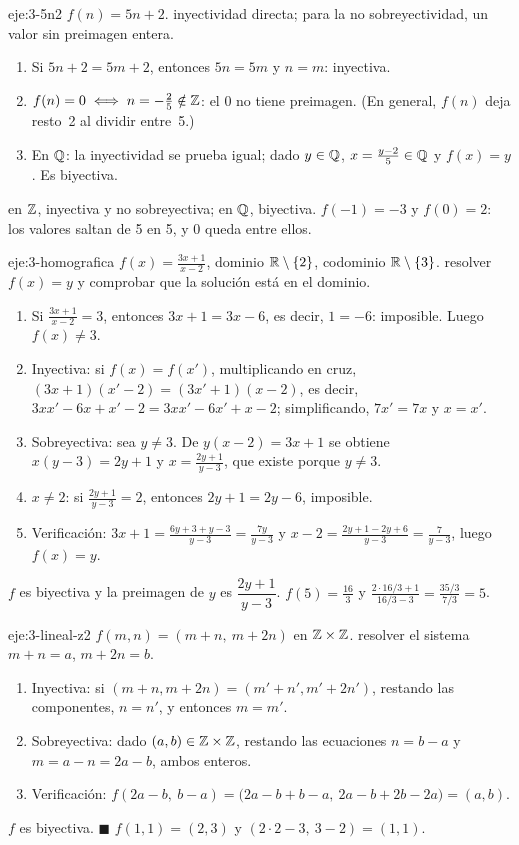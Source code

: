 \begin{solucion}{eje:3-5n2}
\datos $f(n)=5n+2$.
\planteamiento inyectividad directa; para la no sobreyectividad, un valor sin preimagen entera.
\pasos
\begin{enumerate}[label=\arabic*.]
  \item Si $5n+2=5m+2$, entonces $5n=5m$ y $n=m$: inyectiva.
  \item $f(n)=0\iff n=-\tfrac25\notin\mathbb{Z}$: el $0$ no tiene preimagen. (En general, $f(n)$ deja resto~2 al dividir entre~5.)
  \item En $\mathbb{Q}$: la inyectividad se prueba igual; dado $y\in\mathbb{Q}$, $x=\tfrac{y-2}{5}\in\mathbb{Q}$ y $f(x)=y$. Es biyectiva.
\end{enumerate}
\resultado en $\mathbb{Z}$, inyectiva y no sobreyectiva; en $\mathbb{Q}$, biyectiva.
\comprobacion $f(-1)=-3$ y $f(0)=2$: los valores saltan de 5 en 5, y $0$ queda entre ellos.
\end{solucion}

\begin{solucion}{eje:3-homografica}
\datos $f(x)=\tfrac{3x+1}{x-2}$, dominio $\mathbb{R}\setminus\{2\}$, codominio $\mathbb{R}\setminus\{3\}$.
\planteamiento resolver $f(x)=y$ y comprobar que la solución está en el dominio.
\pasos
\begin{enumerate}[label=\arabic*.]
  \item Si $\tfrac{3x+1}{x-2}=3$, entonces $3x+1=3x-6$, es decir, $1=-6$: imposible. Luego $f(x)\neq3$.
  \item Inyectiva: si $f(x)=f(x')$, multiplicando en cruz, $(3x+1)(x'-2)=(3x'+1)(x-2)$, es decir, $3xx'-6x+x'-2=3xx'-6x'+x-2$; simplificando, $7x'=7x$ y $x=x'$.
  \item Sobreyectiva: sea $y\neq3$. De $y(x-2)=3x+1$ se obtiene $x(y-3)=2y+1$ y $x=\tfrac{2y+1}{y-3}$, que existe porque $y\neq3$.
  \item $x\neq2$: si $\tfrac{2y+1}{y-3}=2$, entonces $2y+1=2y-6$, imposible.
  \item Verificación: $3x+1=\tfrac{6y+3+y-3}{y-3}=\tfrac{7y}{y-3}$ y $x-2=\tfrac{2y+1-2y+6}{y-3}=\tfrac{7}{y-3}$, luego $f(x)=y$.
\end{enumerate}
\resultado $f$ es biyectiva y la preimagen de $y$ es $\dfrac{2y+1}{y-3}$.
\comprobacion $f(5)=\tfrac{16}{3}$ y $\tfrac{2\cdot16/3+1}{16/3-3}=\tfrac{35/3}{7/3}=5$.
\end{solucion}

\begin{solucion}{eje:3-lineal-z2}
\datos $f(m,n)=(m+n,\ m+2n)$ en $\mathbb{Z}\times\mathbb{Z}$.
\planteamiento resolver el sistema $m+n=a$, $m+2n=b$.
\pasos
\begin{enumerate}[label=\arabic*.]
  \item Inyectiva: si $(m+n,m+2n)=(m'+n',m'+2n')$, restando las componentes, $n=n'$, y entonces $m=m'$.
  \item Sobreyectiva: dado $(a,b)\in\mathbb{Z}\times\mathbb{Z}$, restando las ecuaciones $n=b-a$ y $m=a-n=2a-b$, ambos enteros.
  \item Verificación: $f(2a-b,\ b-a)=\bigl(2a-b+b-a,\ 2a-b+2b-2a\bigr)=(a,b)$.
\end{enumerate}
\resultado $f$ es biyectiva. \hfill$\blacksquare$
\comprobacion $f(1,1)=(2,3)$ y $(2\cdot2-3,\ 3-2)=(1,1)$.
\end{solucion}

